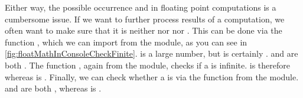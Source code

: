 Either way, the possible occurrence  and  in floating point computations is a cumbersome issue.
If we want to further process results of a computation, we often want to make sure that it is neither  nor  nor .
This can be done via the function , which we can import from the  module, as you can see in \cref{fig:floatMathInConsoleCheckFinite}.
 is a large number, but  is certainly .
 and  are both .
The function , again from the  module, checks if a  is infinite.
 is therefore  whereas  is .
Finally, we can check whether a  is  via the  function from the  module.
 and  are both , whereas  is .%
%
\endhsection%
%
\endhsection%
%
